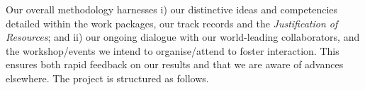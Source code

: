 \documentclass[a4paper,11pt]{article}
\begin{document}
Our overall methodology harnesses i) our distinctive
ideas and competencies detailed within the work packages, our track records and the {\em
  Justification of Resources}; and 
ii) our ongoing dialogue with our
world-leading collaborators, and the workshop/events we intend to
organise/attend to foster interaction. This ensures both rapid
feedback on our results and that we are aware of advances elsewhere. The
project is structured as follows.



\end{document}
